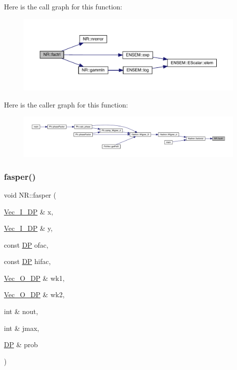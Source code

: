 Here is the call graph for this function\+:\nopagebreak
\begin{figure}[H]
\begin{center}
\leavevmode
\includegraphics[width=350pt]{da/d46/namespaceNR_ac76d8c81ea3f7dacb7bc39f8f2e67f0a_cgraph}
\end{center}
\end{figure}
Here is the caller graph for this function\+:
\nopagebreak
\begin{figure}[H]
\begin{center}
\leavevmode
\includegraphics[width=350pt]{da/d46/namespaceNR_ac76d8c81ea3f7dacb7bc39f8f2e67f0a_icgraph}
\end{center}
\end{figure}
\mbox{\label{namespaceNR_a28ce9fba247ed103e2ffb545d671840e}} 
\subsubsection{\texorpdfstring{fasper()}{fasper()}}
{\footnotesize\ttfamily void N\+R\+::fasper (\begin{DoxyParamCaption}\item[{\mbox{\hyperlink{namespaceNR_a9f943da53862537c552e2a770cb170ae}{Vec\+\_\+\+I\+\_\+\+DP}} \&}]{x,  }\item[{\mbox{\hyperlink{namespaceNR_a9f943da53862537c552e2a770cb170ae}{Vec\+\_\+\+I\+\_\+\+DP}} \&}]{y,  }\item[{const \mbox{\hyperlink{namespaceNR_af6ff762dd605ff477b8e52387253a02a}{DP}}}]{ofac,  }\item[{const \mbox{\hyperlink{namespaceNR_af6ff762dd605ff477b8e52387253a02a}{DP}}}]{hifac,  }\item[{\mbox{\hyperlink{namespaceNR_a970094d23441f8ef6a45282a7eb2103d}{Vec\+\_\+\+O\+\_\+\+DP}} \&}]{wk1,  }\item[{\mbox{\hyperlink{namespaceNR_a970094d23441f8ef6a45282a7eb2103d}{Vec\+\_\+\+O\+\_\+\+DP}} \&}]{wk2,  }\item[{int \&}]{nout,  }\item[{int \&}]{jmax,  }\item[{\mbox{\hyperlink{namespaceNR_af6ff762dd605ff477b8e52387253a02a}{DP}} \&}]{prob }\end{DoxyParamCaption})}

